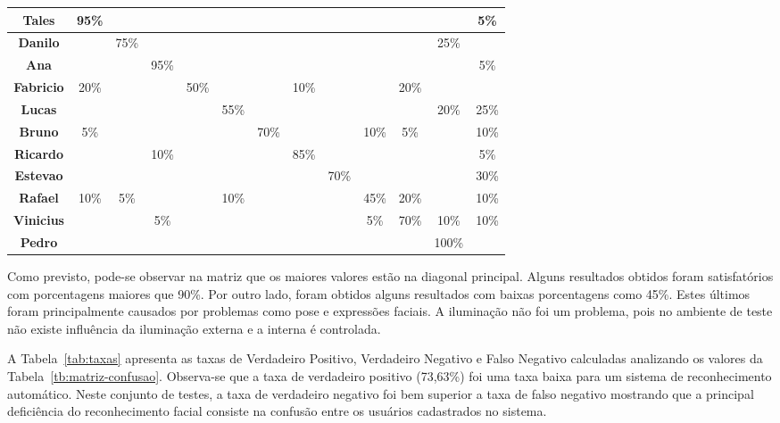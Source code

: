 \begin{table}[htb]
\begin{center}
\begin{tabular}{|c|c|c|c|c|c|c|c|c|c|c|c|c|}
				\hline \bf Tales 		& 95\% & 			& 		 & 			&   	 & 			& 		 & 			& 		 & 			& 		 & 5\%	\\ 
				\hline \bf Danilo 	& 		 & 75\% & 		 & 			&   	 & 			& 		 & 			& 		 & 			& 25\% &		 	\\
				\hline \bf Ana 			& 		 & 			& 95\% & 			&   	 & 			& 		 & 			& 		 & 			& 		 & 5\%  \\
				\hline \bf Fabricio & 20\% & 			& 		 & 50\% &      & 			& 10\% & 			&  	   & 20\% & 		 &		  \\
				\hline \bf Lucas 		& 		 & 			& 		 & 			& 55\% & 			& 		 & 			& 		 & 			& 20\% & 25\% \\
				\hline \bf Bruno 		& 5\%	 & 			& 		 & 			& 		 & 70\% & 		 & 			& 10\% & 	5\%	& 		 & 10\%	\\
				\hline \bf Ricardo 	& 		 & 			& 10\% & 			& 		 & 			& 85\% & 			& 		 & 			& 		 & 5\%  \\
				\hline \bf Estevao 	& 		 & 			& 		 & 			& 		 & 			& 		 & 70\% & 		 & 			& 		 & 30\% \\
				\hline \bf Rafael 	& 10\% & 	5\%	& 		 & 			& 10\% & 			& 		 & 			& 45\% & 20\% & 		 & 10\% \\
				\hline \bf Vinicius & 		 & 			& 5\%  & 			& 		 & 			& 		 & 			& 5\%  & 70\% & 10\% & 10\% \\
				\hline \bf Pedro 		& 		 & 			& 		 & 			& 		 & 			& 		 & 			& 		 & 			& 100\%&		  \\
				\hline
			\end{tabular}
		\end{center}
	\end{table}

	Como previsto, pode-se observar na matriz que os maiores valores estão na diagonal principal. Alguns resultados obtidos foram satisfatórios com porcentagens maiores que 90\%. Por outro lado, foram obtidos alguns resultados com baixas porcentagens como 45\%. Estes últimos foram principalmente causados por problemas como pose e expressões faciais. A iluminação não foi um problema, pois no ambiente de teste não existe influência da iluminação externa e a interna é controlada. 

	A Tabela~\ref{tab:taxas} apresenta as taxas de Verdadeiro Positivo, Verdadeiro Negativo e Falso Negativo calculadas analizando os valores da Tabela~\ref{tb:matriz-confusao}. Observa-se que a taxa de verdadeiro positivo (73,63\%) foi uma taxa baixa para um sistema de reconhecimento automático. Neste conjunto de testes, a taxa de verdadeiro negativo foi bem superior a taxa de falso negativo mostrando que a principal deficiência do reconhecimento facial consiste na confusão entre os usuários cadastrados no sistema.


